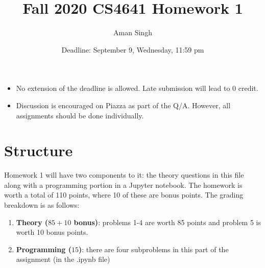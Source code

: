 \documentclass{article}
\title{Fall 2020 CS4641 Homework 1}
\author{Aman Singh}
\date{Deadline: September 9, Wednesday, 11:59 pm}
\begin{document}
\maketitle
\begin{itemize}
    \item No extension of the deadline is allowed. Late submission will lead to 0 credit.
    \item Discussion is encouraged on Piazza as part of the Q/A. However, all assignments should be done individually.
\end{itemize}

\section*{Structure}
Homework 1 will have two components to it: the theory questions in this file along with a programming portion in a Jupyter notebook. The homework is worth a total of 110 points, where 10 of these are bonus points. The grading breakdown is as follows:
\begin{enumerate}
    \item \textbf{Theory ($85+10$ bonus)}: problems 1-4 are worth 85 points and problem 5 is worth 10 bonus points.
    \item \textbf{Programming ($15$)}: there are four subproblems in this part of the assignment (in the .ipynb file)
\end{enumerate}
\end{document}
